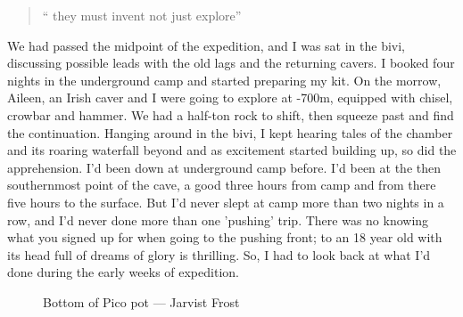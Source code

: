 \begin{quote}`` they must invent not just explore''\end{quote}

We had passed the midpoint of the expedition, and I was sat in the bivi, discussing possible leads with the old lags and the returning cavers. I booked four nights in the underground camp and started preparing my kit. On the morrow, Aileen, an Irish caver and I were going to explore at -700m, equipped with chisel, crowbar and hammer. We had a half-ton rock to shift, then squeeze past and find the continuation. Hanging around in the bivi, I kept hearing tales of the chamber and its roaring waterfall beyond and as excitement started building up, so did the apprehension. I'd been down at underground camp before. I'd been at the then southernmost point of the cave, a good three hours from camp and from there five hours to the surface. But I'd never slept at camp  more than two nights in a row, and I'd never done more than one 'pushing' trip. 
There was no knowing what you signed up for when going to the pushing front; to an 18 year old with its head full of dreams of glory is thrilling. So, I had to look back at what I'd done during the early weeks of expedition.
\begin{figure}[t!]
\checkoddpage \ifoddpage \forcerectofloat \else \forceversofloat \fi
\centering
{}
\caption{Bottom of Pico pot --- Jarvist Frost}
\label{Pico}
\end{figure}



